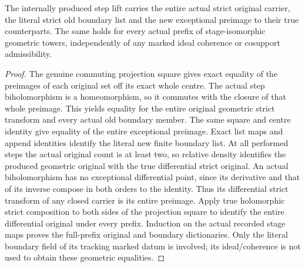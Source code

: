 \begin{lemma}
\label{hir:general-nc-actual-highest-step-pair-transport}
\leanok
The internally produced step lift carries the entire actual strict
original carrier, the literal strict old boundary list and the new
exceptional preimage to their true counterparts. The same holds for
every actual prefix of stage-isomorphic geometric towers, independently
of any marked ideal coherence or cosupport admissibility.
\end{lemma}
\begin{proof}
The genuine commuting projection square gives exact equality of the
preimages of each original set off its exact whole centre. The actual
step biholomorphism is a homeomorphism, so it commutes with the closure
of that whole preimage. This yields equality for the entire original
geometric strict transform and every actual old boundary member. The
same square and centre identity give equality of the entire exceptional
preimage. Exact list maps and append identities identify the literal
new finite boundary list. At all performed steps the actual original
count is at least two, so relative density identifies the produced
geometric original with the true differential strict original. An actual
biholomorphism has no exceptional differential point, since its derivative
and that of its inverse compose in both orders to the identity. Thus its
differential strict transform of any closed carrier is its entire preimage.
Apply true holomorphic strict composition to both sides of the projection
square to identify the entire differential original under every prefix. Induction on the actual recorded stage maps
proves the full-prefix original and boundary dictionaries. Only the
literal boundary field of its tracking marked datum is involved; its
ideal/coherence is not used to obtain these geometric equalities.
\end{proof}

